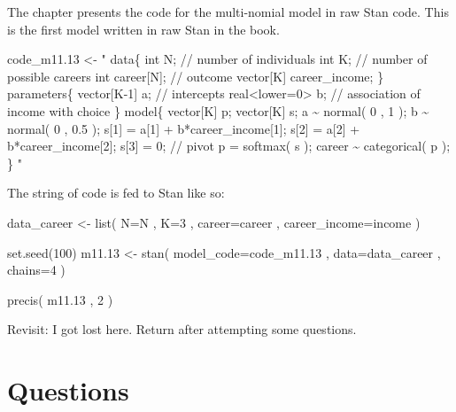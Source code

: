 \documentclass[
]{book}
\newenvironment{Shaded}{\begin{snugshade}}{\end{snugshade}}
\newcommand{\AttributeTok}[1]{\textcolor[rgb]{0.77,0.63,0.00}{#1}}
\newcommand{\DecValTok}[1]{\textcolor[rgb]{0.00,0.00,0.81}{#1}}
\newcommand{\FloatTok}[1]{\textcolor[rgb]{0.00,0.00,0.81}{#1}}
\newcommand{\FunctionTok}[1]{\textcolor[rgb]{0.00,0.00,0.00}{#1}}
\newcommand{\NormalTok}[1]{#1}
\newcommand{\OtherTok}[1]{\textcolor[rgb]{0.56,0.35,0.01}{#1}}
\newcommand{\StringTok}[1]{\textcolor[rgb]{0.31,0.60,0.02}{#1}}
\begin{document}
The chapter presents the code for the multi-nomial model in raw Stan code. This is the first model written in raw Stan in the book.

\begin{Shaded}
\begin{Highlighting}[]
\NormalTok{code\_m11}\FloatTok{.13} \OtherTok{\textless{}{-}} \StringTok{" data\{}
\StringTok{int N; // number of individuals }
\StringTok{int K; // number of possible careers }
\StringTok{int career[N]; // outcome }
\StringTok{vector[K] career\_income;}
\StringTok{\} }
\StringTok{parameters\{}
\StringTok{vector[K{-}1] a; // intercepts }
\StringTok{real\textless{}lower=0\textgreater{} b; // association of income with choice}
\StringTok{\} }
\StringTok{model\{}
\StringTok{vector[K] p; }
\StringTok{vector[K] s; }
\StringTok{a \textasciitilde{} normal( 0 , 1 ); }
\StringTok{b \textasciitilde{} normal( 0 , 0.5 ); }
\StringTok{s[1] = a[1] + b*career\_income[1]; }
\StringTok{s[2] = a[2] + b*career\_income[2]; }
\StringTok{s[3] = 0; // pivot }
\StringTok{p = softmax( s ); }
\StringTok{career \textasciitilde{} categorical( p );}
\StringTok{\}}
\StringTok{"}
\end{Highlighting}
\end{Shaded}

The string of code is fed to Stan like so:

\begin{Shaded}
\begin{Highlighting}[]
\NormalTok{data\_career }\OtherTok{\textless{}{-}} \FunctionTok{list}\NormalTok{( }\AttributeTok{N=}\NormalTok{N , }\AttributeTok{K=}\DecValTok{3}\NormalTok{ , }\AttributeTok{career=}\NormalTok{career , }\AttributeTok{career\_income=}\NormalTok{income ) }

\FunctionTok{set.seed}\NormalTok{(}\DecValTok{100}\NormalTok{)}
\NormalTok{m11}\FloatTok{.13} \OtherTok{\textless{}{-}} \FunctionTok{stan}\NormalTok{( }\AttributeTok{model\_code=}\NormalTok{code\_m11}\FloatTok{.13}\NormalTok{ , }\AttributeTok{data=}\NormalTok{data\_career , }\AttributeTok{chains=}\DecValTok{4}\NormalTok{ )}


\FunctionTok{precis}\NormalTok{( m11}\FloatTok{.13}\NormalTok{ , }\DecValTok{2}\NormalTok{ )}
\end{Highlighting}
\end{Shaded}

Revisit: I got lost here. Return after attempting some questions.

\hypertarget{questions-10}{%
\section{Questions}\label{questions-10}}
\end{document}
